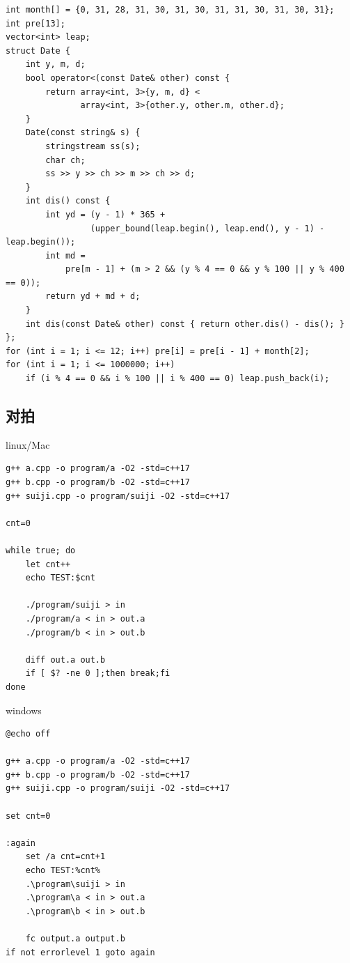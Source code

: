 \documentclass[UTF8]{ctexart}
\begin{document}
\begin{sloppypar}
\begin{lstlisting}[style=cpp]
int month[] = {0, 31, 28, 31, 30, 31, 30, 31, 31, 30, 31, 30, 31};
int pre[13];
vector<int> leap;
struct Date {
    int y, m, d;
    bool operator<(const Date& other) const {
        return array<int, 3>{y, m, d} <
               array<int, 3>{other.y, other.m, other.d};
    }
    Date(const string& s) {
        stringstream ss(s);
        char ch;
        ss >> y >> ch >> m >> ch >> d;
    }
    int dis() const {
        int yd = (y - 1) * 365 +
                 (upper_bound(leap.begin(), leap.end(), y - 1) - leap.begin());
        int md =
            pre[m - 1] + (m > 2 && (y % 4 == 0 && y % 100 || y % 400 == 0));
        return yd + md + d;
    }
    int dis(const Date& other) const { return other.dis() - dis(); }
};
for (int i = 1; i <= 12; i++) pre[i] = pre[i - 1] + month[2];
for (int i = 1; i <= 1000000; i++)
    if (i % 4 == 0 && i % 100 || i % 400 == 0) leap.push_back(i);
\end{lstlisting}

\subsection{对拍}

linux/Mac

\begin{lstlisting}[style=cpp]
g++ a.cpp -o program/a -O2 -std=c++17
g++ b.cpp -o program/b -O2 -std=c++17
g++ suiji.cpp -o program/suiji -O2 -std=c++17

cnt=0

while true; do
    let cnt++
    echo TEST:$cnt

    ./program/suiji > in
    ./program/a < in > out.a
    ./program/b < in > out.b

    diff out.a out.b
    if [ $? -ne 0 ];then break;fi
done
\end{lstlisting}

windows

\begin{lstlisting}[style=cpp]
@echo off

g++ a.cpp -o program/a -O2 -std=c++17
g++ b.cpp -o program/b -O2 -std=c++17
g++ suiji.cpp -o program/suiji -O2 -std=c++17

set cnt=0

:again
    set /a cnt=cnt+1
    echo TEST:%cnt%
    .\program\suiji > in
    .\program\a < in > out.a
    .\program\b < in > out.b

    fc output.a output.b
if not errorlevel 1 goto again
\end{lstlisting}


\end{sloppypar}
\end{document}
